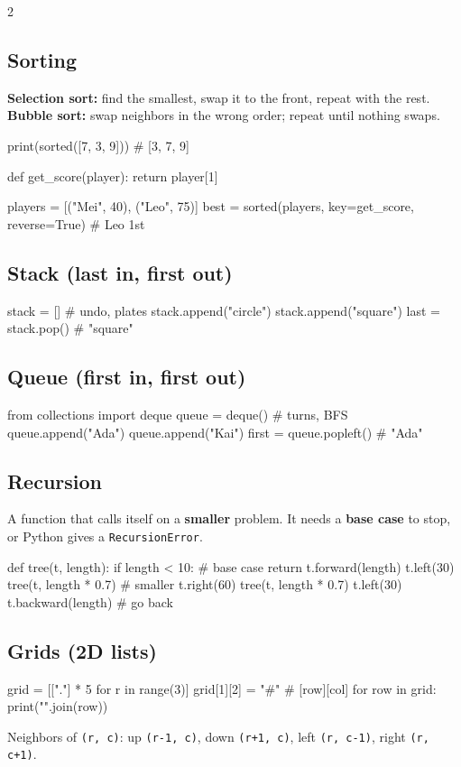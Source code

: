 \documentclass[level=3]{kidscode}
\begin{document}
\begin{multicols}{2}
\subsection{Sorting}
\textbf{Selection sort:} find the smallest, swap it to the front, repeat with the rest.
\textbf{Bubble sort:} swap neighbors in the wrong order; repeat until nothing swaps.
\begin{sheetcode}
print(sorted([7, 3, 9]))  # [3, 7, 9]

def get_score(player):
    return player[1]

players = [("Mei", 40), ("Leo", 75)]
best = sorted(players, key=get_score,
              reverse=True)  # Leo 1st
\end{sheetcode}

\subsection{Stack (last in, first out)}
\begin{sheetcode}
stack = []            # undo, plates
stack.append("circle")
stack.append("square")
last = stack.pop()    # "square"
\end{sheetcode}

\subsection{Queue (first in, first out)}
\begin{sheetcode}
from collections import deque
queue = deque()       # turns, BFS
queue.append("Ada")
queue.append("Kai")
first = queue.popleft()   # "Ada"
\end{sheetcode}

\subsection{Recursion}
A function that calls itself on a \textbf{smaller} problem. It needs a \textbf{base case} to stop,
or Python gives a \texttt{RecursionError}.
\begin{sheetcode}
def tree(t, length):
    if length < 10:       # base case
        return
    t.forward(length)
    t.left(30)
    tree(t, length * 0.7) # smaller
    t.right(60)
    tree(t, length * 0.7)
    t.left(30)
    t.backward(length)    # go back
\end{sheetcode}

\subsection{Grids (2D lists)}
\begin{sheetcode}
grid = [["."] * 5 for r in range(3)]
grid[1][2] = "#"          # [row][col]
for row in grid:
    print("".join(row))
\end{sheetcode}
Neighbors of \texttt{(r, c)}: up \texttt{(r-1, c)}, down \texttt{(r+1, c)}, left
\texttt{(r, c-1)}, right \texttt{(r, c+1)}.


\end{multicols}
\end{document}
